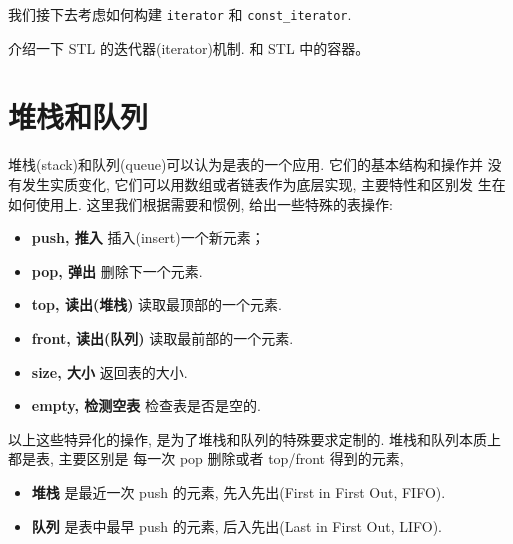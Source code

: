 \documentclass[a4paper]{ctexart}
\theoremstyle{definition}
\theoremstyle{definition}
\begin{document}



我们接下去考虑如何构建 \verb|iterator| 和 \verb|const_iterator|. 

介绍一下 STL 的迭代器(iterator)机制. 和 STL 中的容器。

\section{堆栈和队列}

堆栈(stack)和队列(queue)可以认为是表的一个应用. 它们的基本结构和操作并
没有发生实质变化, 它们可以用数组或者链表作为底层实现, 主要特性和区别发
生在如何使用上. 这里我们根据需要和惯例, 给出一些特殊的表操作:
\begin{itemize}
  \item {\bf push, 推入} 插入(insert)一个新元素；
  \item {\bf pop, 弹出} 删除下一个元素. 
  \item {\bf top, 读出(堆栈)} 读取最顶部的一个元素.
  \item {\bf front, 读出(队列)} 读取最前部的一个元素.
  \item {\bf size, 大小} 返回表的大小.
  \item {\bf empty, 检测空表} 检查表是否是空的.
  
\end{itemize}

以上这些特异化的操作, 是为了堆栈和队列的特殊要求定制的. 堆栈和队列本质上都是表, 主要区别是
每一次 pop 删除或者 top/front 得到的元素,
\begin{itemize}
\item {\bf 堆栈} 是最近一次 push 的元素, 先入先出(First in First Out,
  FIFO).
\item {\bf 队列} 是表中最早 push 的元素, 后入先出(Last in First Out,
  LIFO).
\end{itemize}
\end{document}
